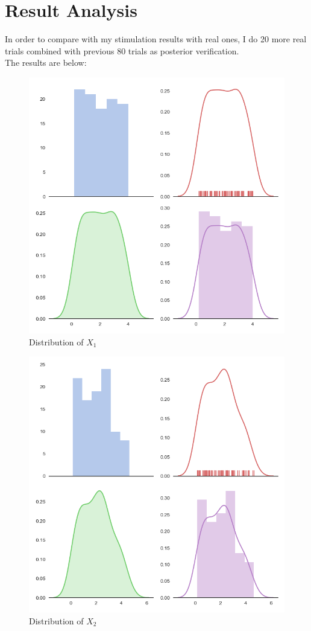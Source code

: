 \documentclass[10pt,journal]{IEEEtran}
\begin{document}
\section{Result Analysis}
In order to compare with my stimulation results with real ones, I do 20 more real trials combined with previous 80 trials as posterior verification.
\\
The results are below:
\begin{figure}[!ht]
	\centering
	\includegraphics[width=0.7\columnwidth,height=0.6\linewidth]{Posterior_1.png}
	\caption{Distribution of \(X_1\)}
\end{figure}
\begin{figure}[!ht]
	\centering
	\includegraphics[width=0.7\columnwidth,height=0.625\linewidth]{Posterior_2.png}
	\caption{Distribution of \(X_2\)}
\end{figure}
\end{document}
